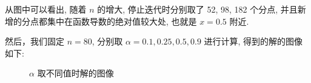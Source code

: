 \documentclass[UTF8]{article}
\begin{document}
    从图中可以看出, 随着 $n$ 的增大, 停止迭代时分别取了 52, 98, 182 个分点, 并且新增的分点都集中在函数导数的绝对值较大处, 也就是 $x=0.5$ 附近.
    \newline

    然后，我们固定 $n=80$, 分别取 $\alpha=0.1,0.25,0.5,0.9$ 进行计算, 得到的解的图像如下:

    \begin{figure}[h]
        \centering
        \caption{$\alpha$ 取不同值时解的图像}
    \end{figure}
\end{document}
